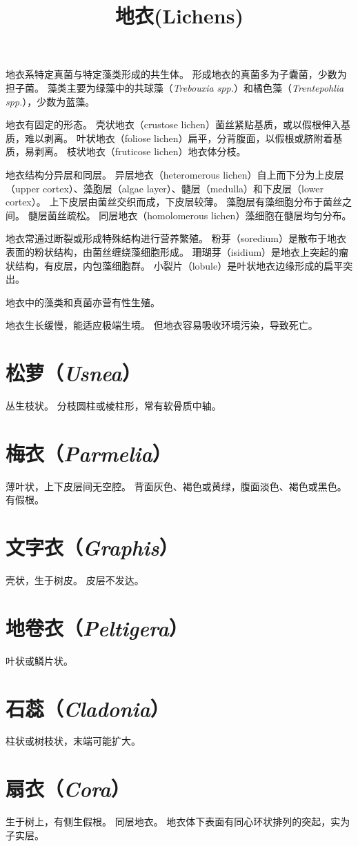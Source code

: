 \documentclass[11pt]{article}
\title{地衣(Lichens)}
\date{}
\begin{document}
  \maketitle

  \linenumbers
地衣系特定真菌与特定藻类形成的共生体。
形成地衣的真菌多为子囊菌，少数为担子菌。
藻类主要为绿藻中的共球藻（\textit{Trebouxia spp.}）和橘色藻（\textit{Trentepohlia spp.}），少数为蓝藻。

\par

地衣有固定的形态。
壳状地衣（crustose lichen）菌丝紧贴基质，或以假根伸入基质，难以剥离。
叶状地衣（foliose lichen）扁平，分背腹面，以假根或脐附着基质，易剥离。
枝状地衣（fruticose lichen）地衣体分枝。

\par

地衣结构分异层和同层。
异层地衣（heteromerous lichen）自上而下分为上皮层（upper cortex）、藻胞层（algae layer）、髓层（medulla）和下皮层（lower cortex）。
上下皮层由菌丝交织而成，下皮层较薄。
藻胞层有藻细胞分布于菌丝之间。
髓层菌丝疏松。
同层地衣（homolomerous lichen）藻细胞在髓层均匀分布。

\par

地衣常通过断裂或形成特殊结构进行营养繁殖。
粉芽（soredium）是散布于地衣表面的粉状结构，由菌丝缠绕藻细胞形成。
珊瑚芽（isidium）是地衣上突起的瘤状结构，有皮层，内包藻细胞群。
小裂片（lobule）是叶状地衣边缘形成的扁平突出。

\par

地衣中的藻类和真菌亦营有性生殖。

\par

地衣生长缓慢，能适应极端生境。
但地衣容易吸收环境污染，导致死亡。

\section{松萝（\textit{Usnea}）}
丛生枝状。
分枝圆柱或棱柱形，常有软骨质中轴。

\section{梅衣（\textit{Parmelia}）}
薄叶状，上下皮层间无空腔。
背面灰色、褐色或黄绿，腹面淡色、褐色或黑色。
有假根。

\section{文字衣（\textit{Graphis}）}
壳状，生于树皮。
皮层不发达。

\section{地卷衣（\textit{Peltigera}）}
叶状或鳞片状。

\section{石蕊（\textit{Cladonia}）}
柱状或树枝状，末端可能扩大。

\section{扇衣（\textit{Cora}）}
生于树上，有侧生假根。
同层地衣。
地衣体下表面有同心环状排列的突起，实为子实层。
\end{document}
